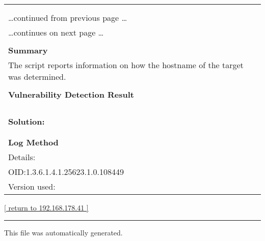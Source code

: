 \documentclass{article}
\begin{document}
\begin{longtable}{|p{}|}
\hline
\rowcolor{gvm_log}{\color{white}{Log (CVSS: 0.0) }}\\
\rowcolor{gvm_log}{\color{white}{NVT: Hostname Determination Reporting}}\\
\hline
\endfirsthead
\hfill\ldots continued from previous page \ldots \\
\hline
\endhead
\hline
\ldots continues on next page \ldots \\
\endfoot
\hline
\endlastfoot
\\
\textbf{Summary}\\
The script reports information on how the hostname
  of the target was determined.\\

        \hline
        \\
\textbf{Vulnerability Detection Result}\\
\rowcolor{white}{\verb=Hostname determination for IP 192.168.178.41:=}\\
\rowcolor{white}{\verb=Hostname|Source=}\\
\rowcolor{white}{\verb=nasale.fritz.box|Reverse-DNS=}\\

          \hline
          \\
\textbf{Solution:}\\
\\


        \hline
        \\
\textbf{Log Method}\\
Details:
\rowcolor{white}{\verb=Hostname Determination Reporting=}\\
OID:1.3.6.1.4.1.25623.1.0.108449\\
Version used:
\rowcolor{white}{\verb=2018-11-19T11:11:31Z=}\\
\end{longtable}

\begin{footnotesize}\hyperref[host:192.168.178.41]{[ return to 192.168.178.41 ]}\end{footnotesize}

\begin{center}
\medskip
\rule{\textwidth}{0.1pt}

This file was automatically generated.
\end{center}
\end{document}
